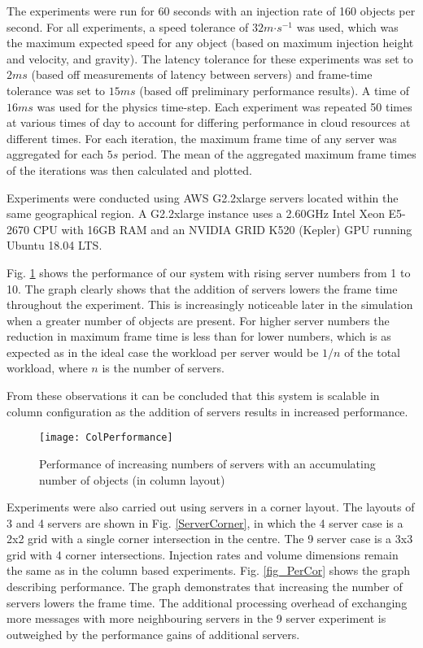 The experiments were run for 60 seconds with an injection rate of 160 objects per second. For all experiments, a speed tolerance of $32m\mathord{\cdot}s^{-1}$ was used, which was the maximum expected speed for any object (based on maximum injection height and velocity, and gravity). The latency tolerance for these experiments was set to $2ms$ (based off measurements of latency between servers) and frame-time tolerance was set to $15ms$ (based off preliminary performance results). A time of $16ms$ was used for the physics time-step. Each experiment was repeated 50 times at various times of day to account for differing performance in cloud resources at different times. For each iteration, the maximum frame time of any server was aggregated for each $5s$ period. The mean of the aggregated maximum frame times of the iterations was then calculated and plotted.

Experiments were conducted using AWS G2.2xlarge servers located within the same geographical region. A G2.2xlarge instance uses a 2.60GHz Intel Xeon E5-2670 CPU with 16GB RAM and an NVIDIA GRID K520 (Kepler) GPU running Ubuntu 18.04 LTS.

Fig. \ref{fig_PerCol} shows the performance of our system with rising server numbers from 1 to 10. The graph clearly shows that the addition of servers lowers the frame time throughout the experiment. This is increasingly noticeable later in the simulation when a greater number of objects are present. For higher server numbers the reduction in maximum frame time is less than for lower numbers, which is as expected as in the ideal case the workload per server would be $1/n$ of the total workload, where $n$ is the number of servers. 

From these observations it can be concluded that this system is scalable in column configuration as the addition of servers results in increased performance.

\begin{figure}[!t]
	\centering
	\texttt{[image: ColPerformance]}
	\caption{Performance of increasing numbers of servers with an accumulating number of objects (in column layout)}
	\label{fig_PerCol}
\end{figure}

Experiments were also carried out using servers in a corner layout. The layouts of 3 and 4 servers are shown in Fig. \ref{ServerCorner}, in which the 4 server case is a 2x2 grid with a single corner intersection in the centre. The 9 server case is a 3x3 grid with 4 corner intersections. Injection rates and volume dimensions remain the same as in the column based experiments. Fig. \ref{fig_PerCor} shows the graph describing performance. The graph demonstrates that increasing the number of servers lowers the frame time. The additional processing overhead of exchanging more messages with more neighbouring servers in the 9 server experiment is outweighed by the performance gains of additional servers.

